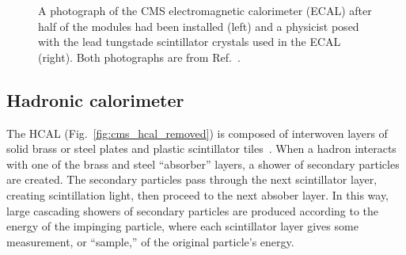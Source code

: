 \begin{figure}[htb]
    \centering
    \quad
    \caption{
        A photograph of the CMS electromagnetic calorimeter (ECAL) after half of the modules had been installed (left) and a physicist posed with the lead tungstade scintillator crystals used in the ECAL (right). 
        Both photographs are from Ref.~\cite{Brice:1431477}.
    }
    \label{fig:cms_ecal}
\end{figure}

\subsection{Hadronic calorimeter}
The HCAL (Fig.~\ref{fig:cms_hcal_removed}) is composed of interwoven layers of solid brass or steel plates and plastic scintillator tiles~\cite{CERN-LHCC-97-031}. 
When a hadron interacts with one of the brass and steel ``absorber'' layers, a shower of secondary particles are created. %
The secondary particles pass through the next scintillator layer, creating scintillation light, then proceed to the next absober layer. 
In this way, large cascading showers of secondary particles are produced according to the energy of the impinging particle, where each scintillator layer gives some measurement, or ``sample,'' of the original particle's energy. 

